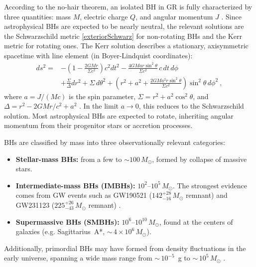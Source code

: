 According to the no-hair theorem, an isolated BH in GR is fully characterized by three quantities: mass $M$, electric charge $Q$, and angular momentum $J$ \cite{Llibre_Peter_Collier_unacosadificildecomprender}. Since astrophysical BHs are expected to be nearly neutral, the relevant solutions are the Schwarzschild metric \eqref{exteriorSchwarz} for non-rotating BHs and the Kerr metric for rotating ones. The Kerr solution describes a stationary, axisymmetric spacetime with line element (in Boyer-Lindquist coordinates):
\begin{equation}
\begin{aligned}
ds^2 = &-\left(1 - \frac{2GMr}{\Sigma c^2}\right)c^2 dt^2 
- \frac{4GMar\sin^2\theta}{\Sigma c^2}\, c\, dt\, d\phi \\
&+ \frac{\Sigma}{\Delta} dr^2 + \Sigma\, d\theta^2 
+ \left(r^2 + a^2 + \frac{2GMa^2 r\sin^2\theta}{\Sigma c^2}\right)\sin^2\theta\, d\phi^2 \ ,
\end{aligned}
\label{kerrmetric}
\end{equation}
where $a = J/(Mc)$ is the spin parameter, $\Sigma = r^2 + a^2\cos^2\theta$, and $\Delta = r^2 - 2GMr/c^2 + a^2$ \cite{Llibre_Peter_Collier_unacosadificildecomprender}. In the limit $a \to 0$, this reduces to the Schwarzschild solution. Most astrophysical BHs are expected to rotate, inheriting angular momentum from their progenitor stars or accretion processes.

BHs are classified by mass into three observationally relevant categories:
\begin{itemize}
    \item \textbf{Stellar-mass BHs:} from a few to $\sim 100\, M_\odot$, formed by collapse of massive stars.
    \item \textbf{Intermediate-mass BHs (IMBHs):} $10^2$--$10^5\, M_\odot$. The strongest evidence comes from GW events such as GW190521 ($142^{+28}_{-16}\, M_\odot$ remnant) \cite{GW190521} and GW231123 ($225^{+26}_{-43}\, M_\odot$ remnant) \cite{gw231123}.
    \item \textbf{Supermassive BHs (SMBHs):} $10^6$--$10^{10}\, M_\odot$, found at the centers of galaxies (e.g. Sagittarius~A*, ${\sim}\,4 \times 10^6\, M_\odot$).
\end{itemize}
Additionally, primordial BHs may have formed from density fluctuations in the early universe, spanning a wide mass range from ${\sim}\,10^{-5}$~g to ${\sim}\,10^5\, M_\odot$ \cite{Carr2021_PBH_constraints}.

\vspace{0.5cm}

